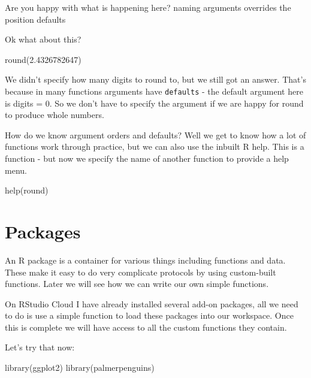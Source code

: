 \documentclass[
]{book}
\newenvironment{Shaded}{\begin{snugshade}}{\end{snugshade}}
\newcommand{\FloatTok}[1]{\textcolor[rgb]{0.00,0.00,0.81}{#1}}
\newcommand{\FunctionTok}[1]{\textcolor[rgb]{0.00,0.00,0.00}{#1}}
\newcommand{\NormalTok}[1]{#1}
\begin{document}
Are you happy with what is happening here? naming arguments overrides the position defaults

Ok what about this?

\begin{Shaded}
\begin{Highlighting}[]
\FunctionTok{round}\NormalTok{(}\FloatTok{2.4326782647}\NormalTok{)}
\end{Highlighting}
\end{Shaded}

We didn't specify how many digits to round to, but we still got an answer. That's because in many functions arguments have \texttt{defaults} - the default argument here is digits = 0. So we don't have to specify the argument if we are happy for round to produce whole numbers.

How do we know argument orders and defaults? Well we get to know how a lot of functions work through practice, but we can also use the inbuilt R help. This is a function - but now we specify the name of another function to provide a help menu.

\begin{Shaded}
\begin{Highlighting}[]
\FunctionTok{help}\NormalTok{(round)}
\end{Highlighting}
\end{Shaded}

\hypertarget{packages}{%
\section{Packages}\label{packages}}

An R package is a container for various things including functions and data. These make it easy to do very complicate protocols by using custom-built functions. Later we will see how we can write our own simple functions.

On RStudio Cloud I have already installed several add-on packages, all we need to do is use a simple function to load these packages into our workspace. Once this is complete we will have access to all the custom functions they contain.

Let's try that now:

\begin{Shaded}
\begin{Highlighting}[]
\FunctionTok{library}\NormalTok{(ggplot2)}
\FunctionTok{library}\NormalTok{(palmerpenguins)}
\end{Highlighting}
\end{Shaded}
\end{document}
